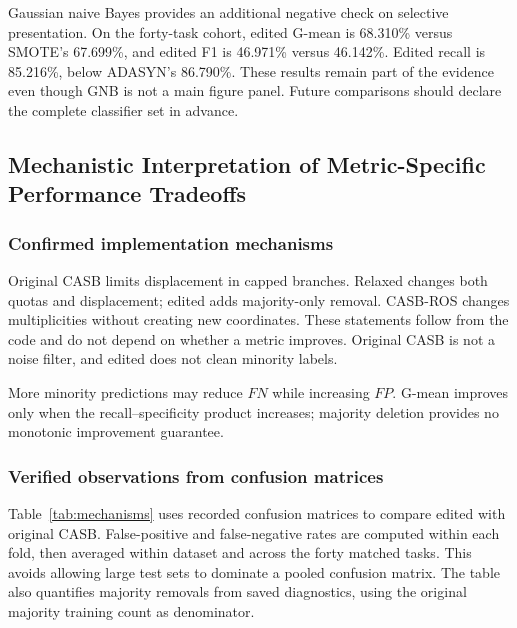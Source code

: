 \documentclass[conference]{IEEEtran}
\begin{document}
Gaussian naive Bayes provides an additional negative check on selective presentation. On the forty-task cohort, edited G-mean is 68.310\% versus SMOTE's 67.699\%, and edited F1 is 46.971\% versus 46.142\%. Edited recall is 85.216\%, below ADASYN's 86.790\%. These results remain part of the evidence even though GNB is not a main figure panel. Future comparisons should declare the complete classifier set in advance.
\begin{table}[!htbp]
\centering\small
\caption{Historical training-only selector over three CASB variants and three ratios (44 datasets). CASB-ROS is not a candidate; RF/LR selector experiments were not run. Scores are percent.}\label{tab:selector}
\end{table}

\subsection{Mechanistic Interpretation of Metric-Specific Performance Tradeoffs}
\subsubsection{Confirmed implementation mechanisms}
Original CASB limits displacement in capped branches. Relaxed changes both quotas and displacement; edited adds majority-only removal. CASB-ROS changes multiplicities without creating new coordinates. These statements follow from the code and do not depend on whether a metric improves. Original CASB is not a noise filter, and edited does not clean minority labels.

More minority predictions may reduce $FN$ while increasing $FP$. G-mean improves only when the recall--specificity product increases; majority deletion provides no monotonic improvement guarantee.

\subsubsection{Verified observations from confusion matrices}
Table~\ref{tab:mechanisms} uses recorded confusion matrices to compare edited with original CASB. False-positive and false-negative rates are computed within each fold, then averaged within dataset and across the forty matched tasks. This avoids allowing large test sets to dominate a pooled confusion matrix. The table also quantifies majority removals from saved diagnostics, using the original majority training count as denominator.
\end{document}
